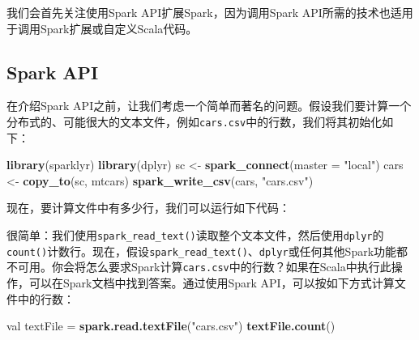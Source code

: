 \documentclass[
]{article}
\newenvironment{Shaded}{\begin{snugshade}}{\end{snugshade}}
\newcommand{\CommentTok}[1]{\textcolor[rgb]{0.56,0.35,0.01}{\textit{#1}}}
\newcommand{\DataTypeTok}[1]{\textcolor[rgb]{0.13,0.29,0.53}{#1}}
\newcommand{\DecValTok}[1]{\textcolor[rgb]{0.00,0.00,0.81}{#1}}
\newcommand{\KeywordTok}[1]{\textcolor[rgb]{0.13,0.29,0.53}{\textbf{#1}}}
\newcommand{\NormalTok}[1]{#1}
\newcommand{\OperatorTok}[1]{\textcolor[rgb]{0.81,0.36,0.00}{\textbf{#1}}}
\newcommand{\StringTok}[1]{\textcolor[rgb]{0.31,0.60,0.02}{#1}}
\begin{document}
我们会首先关注使用Spark API扩展Spark，因为调用Spark
API所需的技术也适用于调用Spark扩展或自定义Scala代码。

\hypertarget{spark-api}{%
\subsection{Spark API}\label{spark-api}}

在介绍Spark
API之前，让我们考虑一个简单而著名的问题。假设我们要计算一个分布式的、可能很大的文本文件，例如\texttt{cars.csv}中的行数，我们将其初始化如下：

\begin{Shaded}
\begin{Highlighting}[]
\KeywordTok{library}\NormalTok{(sparklyr)}
\KeywordTok{library}\NormalTok{(dplyr)}
\NormalTok{sc <-}\StringTok{ }\KeywordTok{spark_connect}\NormalTok{(}\DataTypeTok{master =} \StringTok{"local"}\NormalTok{)}
\NormalTok{cars <-}\StringTok{ }\KeywordTok{copy_to}\NormalTok{(sc, mtcars)}
\KeywordTok{spark_write_csv}\NormalTok{(cars, }\StringTok{"cars.csv"}\NormalTok{)}
\end{Highlighting}
\end{Shaded}

现在，要计算文件中有多少行，我们可以运行如下代码：

\begin{Shaded}
\end{Shaded}

很简单：我们使用\texttt{spark\_read\_text()}读取整个文本文件，然后使用\texttt{dplyr}的\texttt{count()}计数行。现在，假设\texttt{spark\_read\_text()}、\texttt{dplyr}或任何其他Spark功能都不可用。你会将怎么要求Spark计算\texttt{cars.csv}中的行数？如果在Scala中执行此操作，可以在Spark文档中找到答案。通过使用Spark
API，可以按如下方式计算文件中的行数：

\begin{Shaded}
\begin{Highlighting}[]
\NormalTok{val textFile =}\StringTok{ }\KeywordTok{spark.read.textFile}\NormalTok{(}\StringTok{"cars.csv"}\NormalTok{)}
\KeywordTok{textFile.count}\NormalTok{()}
\end{Highlighting}
\end{Shaded}
\end{document}
